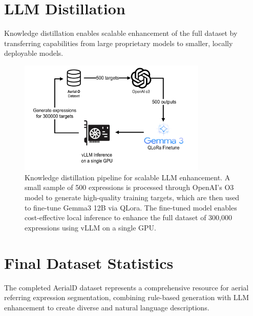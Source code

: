 \section{LLM Distillation}

Knowledge distillation enables scalable enhancement of the full dataset by transferring capabilities from large proprietary models to smaller, locally deployable models.

\begin{figure}[H]
\centering
\includegraphics[width=0.8\textwidth]{./Images/distillation.png}
\caption{Knowledge distillation pipeline for scalable LLM enhancement. A small sample of 500 expressions is processed through OpenAI's O3 model to generate high-quality training targets, which are then used to fine-tune Gemma3 12B via QLora. The fine-tuned model enables cost-effective local inference to enhance the full dataset of 300,000 expressions using vLLM on a single GPU.}
\label{fig:llm_distillation}
\end{figure}


\section{Final Dataset Statistics}

The completed AerialD dataset represents a comprehensive resource for aerial referring expression segmentation, combining rule-based generation with LLM enhancement to create diverse and natural language descriptions.

